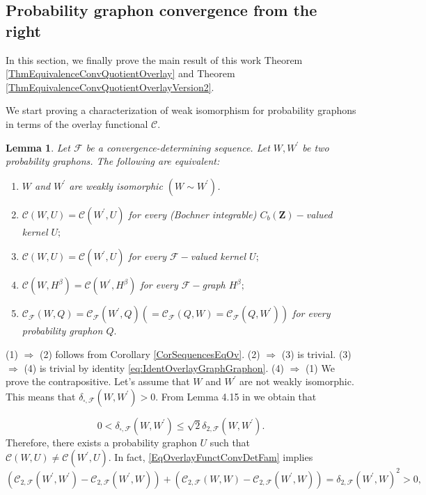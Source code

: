 \documentclass[11pt]{article}
\newtheorem{lemma}[theorem]{Lemma}
\newcommand{\cC}{{\mathcal C}}  %
\newcommand{\cF}{{\mathcal F}}  %
\newcommand{\Space}{\mathbf{Z}}
\newcommand{\CbFunct}{C_b(\Space)}
\begin{document}
\subsection{Probability graphon convergence from the right}


In this section, we finally prove the main result of this work Theorem \ref{ThmEquivalenceConvQuotientOverlay} and Theorem \ref{ThmEquivalenceConvQuotientOverlayVersion2}. 

We start proving a characterization of weak isomorphism for probability graphons in terms of the overlay functional $\cC.$

\begin{lemma}\label{EquivWeakIsoOverl}
Let $\cF$ be a convergence-determining sequence. Let $W,W^{\prime}$ be two probability graphons. The following are equivalent:

\begin{enumerate}
\item $W$ and $W^{\prime}$ are weakly isomorphic $(W\sim W^{\prime})$.
\item $\cC(W,U)=\cC(W^{\prime},U)$
for every (Bochner integrable) $\CbFunct-$valued kernel $U;$
\item $\cC(W,U)=\cC(W^{\prime},U)$
for every $\cF-$valued kernel $U;$
\item $\cC(W,H^{\beta})=\cC(W^{\prime},H^{\beta})$
for every $\cF-$graph $H^{\beta};$
\item  $\cC_{\cF}(W,Q)=\cC_{\cF}(W^{\prime},Q)\left(=\cC_{\cF}(Q,W)=\cC_{\cF}(Q,W^{\prime})\right)$ for every probability graphon $Q.$

\end{enumerate}    
\end{lemma}
\proof
(1) $\Rightarrow$ (2) follows from Corollary \ref{CorSequencesEqOv}. \newline
(2) $\Rightarrow$ (3) is trivial. \newline
(3) $\Rightarrow$ (4) is trivial by identity \eqref{eq:IdentOverlayGraphGraphon}. \newline
(4) $\Rightarrow$ (1) We prove the contrapositive. Let's assume that $W$ and $W^{\prime}$ are not weakly isomorphic. This means that $\delta_{\square,\mathcal{F}}(W,W^{\prime})>0.$ From Lemma 4.15 in \cite{abraham2023probabilitygraphons} we obtain that 

$$
0<\delta_{\square,\mathcal{F}}(W,W^{\prime})\leq \sqrt{2}\delta_{2,\mathcal{F}}(W,W^{\prime}).
$$
Therefore, there exists a probability graphon $U$ such that $\mathcal{C}(W, U) \neq \mathcal{C}\left(W^{\prime}, U\right).$ In fact, \eqref{EqOverlayFunctConvDetFam} implies
$$
\left(\mathcal{C}_{2,\mathcal{F}}\left(W^{\prime}, W^{\prime}\right)-\mathcal{C}_{2,\mathcal{F}}\left(W^{\prime}, W\right)\right)+\left(\mathcal{C}_{2,\mathcal{F}}(W, W)-\mathcal{C}_{2,\mathcal{F}}\left(W^{\prime}, W\right)\right)=\delta_{2,\mathcal{F}}\left(W^{\prime}, W\right)^2>0,
$$
\end{document}
